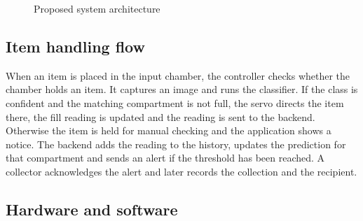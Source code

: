 \documentclass[12pt,a4paper]{report}
\begin{document}
\begin{figure}[h]
\centering
{}
\caption{Proposed system architecture}
\label{fig:arch}
\end{figure}

\subsection{Item handling flow}

When an item is placed in the input chamber, the controller checks whether the chamber holds an item. It captures an image and runs the classifier. If the class is confident and the matching compartment is not full, the servo directs the item there, the fill reading is updated and the reading is sent to the backend. Otherwise the item is held for manual checking and the application shows a notice. The backend adds the reading to the history, updates the prediction for that compartment and sends an alert if the threshold has been reached. A collector acknowledges the alert and later records the collection and the recipient.

\subsection{Hardware and software}
\end{document}
